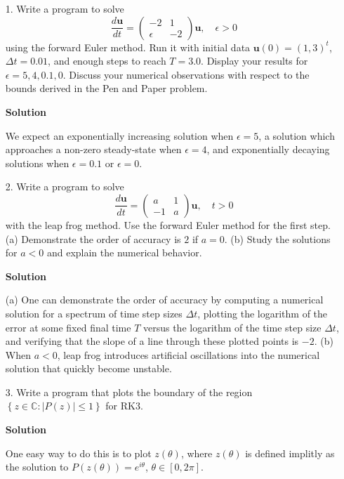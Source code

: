 \documentclass{article}
\begin{document}
\begin{itemize}

\item[1.] Write a program to solve
\begin{equation*}
\frac{d \mathbf{u}}{dt} = \begin{pmatrix} -2 & 1 \\ \epsilon & -2 \end{pmatrix} \mathbf{u}, \quad \epsilon > 0
\end{equation*}
using the forward Euler method.  Run it with initial data $\mathbf{u}(0) = (1,3)^t$, $\Delta t = 0.01$, and enough steps to reach $T = 3.0$. Display your results for $\epsilon = 5, 4, 0.1, 0$. Discuss your numerical observations with respect to the bounds derived in the Pen and Paper problem.

{\bf Solution}

We expect an exponentially increasing solution when $\epsilon = 5$, a solution which approaches a non-zero steady-state when $\epsilon = 4$, and exponentially decaying solutions when $\epsilon = 0.1$ or $\epsilon = 0$.

\item[2.] Write a program to solve
\begin{equation*}
\frac{d \mathbf{u}}{dt} = \begin{pmatrix} a & 1 \\ -1 & a \end{pmatrix} \mathbf{u}, \quad t > 0
\end{equation*}
with the leap frog method. Use the forward Euler method for the first step. (a) Demonstrate the order of accuracy is $2$ if $a = 0$. (b) Study the solutions for $a < 0$ and explain the numerical behavior.

{\bf Solution}

(a) One can demonstrate the order of accuracy by computing a numerical solution for a spectrum of time step sizes $\Delta t$, plotting the logarithm of the error at some fixed final time $T$ versus the logarithm of the time step size $\Delta t$, and verifying that the slope of a line through these plotted points is $-2$. (b) When $a < 0$, leap frog introduces artificial oscillations into the numerical solution that quickly become unstable.

\item[3.] Write a program that plots the boundary of the region $\left\{ z \in \mathbb{C} : \left\lvert P(z) \right\rvert \leq 1 \right\}$ for RK3.

{\bf Solution}

One easy way to do this is to plot $z(\theta)$, where $z(\theta)$ is defined implitly as the solution to $P(z(\theta)) = e^{i \theta}$, $\theta \in [0, 2\pi]$.

\end{itemize}
\end{document}
